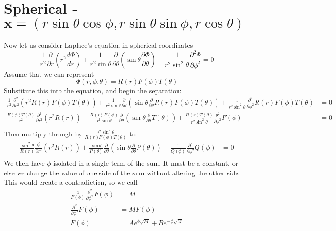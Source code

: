 \documentclass{article}	%
\theoremstyle{definition}
\begin{document}
\section{Spherical - $\mathbf{x}=(r\sin\theta\cos\phi,r\sin\theta\sin\phi,r\cos\theta)$}
Now let us consider Laplace's equation in spherical coordinates
\[ \frac{1}{r^{2}} \frac{\partial}{\partial r}(r^{2}\frac{d\Phi}{dr}) +\frac{1}{r^{2}\sin\theta} \frac{\partial}{\partial\theta}\left( \sin\theta \frac{\partial\Phi}{\partial\theta} \right) +\frac{1}{r^{2}\sin^{2}\theta} \frac{\partial^{2}\Phi}{\partial\phi^{2}} = 0 \]
Assume that we can represent
\[ \Phi(r,\phi,\theta)=R(r)F(\phi)T(\theta) \]
Substitute this into the equation, and begin the separation:
\begin{align*}
\frac{1}{r^{2}} \frac{\partial^{2}}{\partial r^{2}}(r^{2}R(r)F(\phi)T(\theta)) +\frac{1}{r^{2}\sin\theta} \frac{\partial}{\partial\theta}\left( \sin\theta \frac{\partial}{\partial\theta}R(r)F(\phi)T(\theta) \right) +\frac{1}{r^{2}\sin^{2}\theta} \frac{\partial^{2}}{\partial\phi^{2}}R(r)F(\phi)T(\theta) &= 0\\
\frac{F(\phi)T(\theta)}{r^{2}} \frac{\partial^{2}}{\partial r^{2}}(r^{2}R(r)) +\frac{R(r)F(\phi)}{r^{2}\sin\theta} \frac{\partial}{\partial\theta}\left( \sin\theta \frac{\partial}{\partial\theta}T(\theta) \right) +\frac{R(r)T(\theta)}{r^{2}\sin^{2}\theta} \frac{\partial^{2}}{\partial\phi^{2}}F(\phi) &= 0\\
\end{align*}
Then multiply through by 
$
\frac{r^{2}\sin^{2}\theta}{R(r)F(\phi)T(\theta)}
$
to 
\begin{align*}
\frac{\sin^{2}\theta}{R(r)} \frac{\partial^{2}}{\partial r^{2}}(r^{2}R(r)) +\frac{\sin\theta}{P(\theta)} \frac{\partial}{\partial\theta}\left( \sin\theta \frac{\partial}{\partial\theta}P(\theta) \right) +\frac{1}{Q(\phi)} \frac{\partial^{2}}{\partial\phi^{2}}Q(\phi) &= 0\\
\end{align*}
We then have $\phi$ isolated in a single term of the sum. It must be a constant, or else we change the value of one side of the sum without altering the other side. This would create a contradiction, so we call
\begin{align*}
\frac{1}{F(\phi)} \frac{\partial^{2}}{\partial\phi^{2}}F(\phi) &= M\\
\frac{\partial^{2}}{\partial\phi^{2}}F(\phi) &= MF(\phi)\\
F(\phi)&= Ae^{\phi\sqrt{M}} +Be^{-\phi\sqrt{M}}\\
\end{align*}
\end{document}
